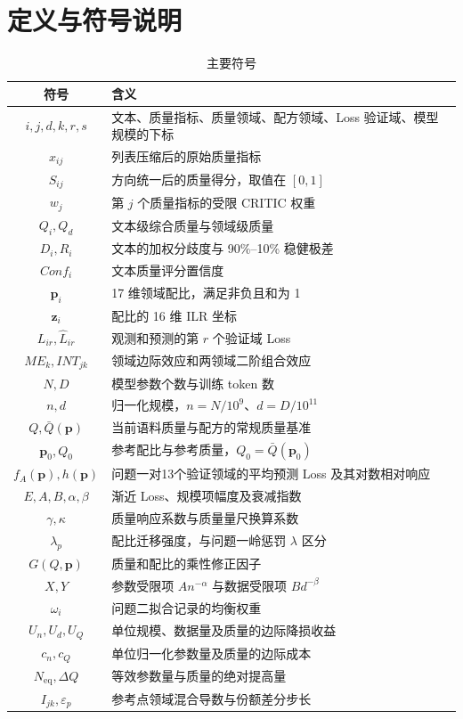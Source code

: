 \documentclass[bwprint]{gmcmthesis}
\begin{document}
\section{定义与符号说明}   %
\begin{table}[H]    %
    \centering
    \caption{主要符号}
    \label{tab:symbols}
    \begin{tabularx}{0.92\textwidth}{cX}
        \toprule
        符号 & 含义 \\
        \midrule
        $i,j,d,k,r,s$ & 文本、质量指标、质量领域、配方领域、Loss 验证域、模型规模的下标 \\
        $x_{ij}$ & 列表压缩后的原始质量指标 \\
        $S_{ij}$ & 方向统一后的质量得分，取值在 $[0,1]$ \\
        $w_j$ & 第 $j$ 个质量指标的受限 CRITIC 权重 \\
        $Q_i,Q_d$ & 文本级综合质量与领域级质量 \\
        $D_i,R_i$ & 文本的加权分歧度与 90\%--10\% 稳健极差 \\
        $Conf_i$ & 文本质量评分置信度 \\
        $\bm p_i$ & 17 维领域配比，满足非负且和为 1 \\
        $\bm z_i$ & 配比的 16 维 ILR 坐标 \\
        $L_{ir},\widehat L_{ir}$ & 观测和预测的第 $r$ 个验证域 Loss \\
        $ME_k,INT_{jk}$ & 领域边际效应和两领域二阶组合效应 \\

        $N,D$ & 模型参数个数与训练 token 数 \\
        $n,d$ & 归一化规模，$n=N/10^9$、$d=D/10^{11}$ \\
        $Q,\bar Q(\bm p)$ & 当前语料质量与配方的常规质量基准 \\
        $\bm p_0,Q_0$ & 参考配比与参考质量，$Q_0=\bar Q(\bm p_0)$ \\
        $f_A(\bm p),h(\bm p)$ & 问题一对13个验证领域的平均预测 Loss 及其对数相对响应 \\
        $E,A,B,\alpha,\beta$ & 渐近 Loss、规模项幅度及衰减指数 \\
        $\gamma,\kappa$ & 质量响应系数与质量量尺换算系数 \\
        $\lambda_p$ & 配比迁移强度，与问题一岭惩罚 $\lambda$ 区分 \\
        $G(Q,\bm p)$ & 质量和配比的乘性修正因子 \\
        $X,Y$ & 参数受限项 $An^{-\alpha}$ 与数据受限项 $Bd^{-\beta}$ \\
        $\omega_i$ & 问题二拟合记录的均衡权重 \\
        $U_n,U_d,U_Q$ & 单位规模、数据量及质量的边际降损收益 \\
        $c_n,c_Q$ & 单位归一化参数量及质量的边际成本 \\
        $N_{\mathrm{eq}},\Delta Q$ & 等效参数量与质量的绝对提高量 \\
        $I_{jk},\varepsilon_p$ & 参考点领域混合导数与份额差分步长 \\
        
        \bottomrule
    \end{tabularx}
\end{table}
\end{document}

